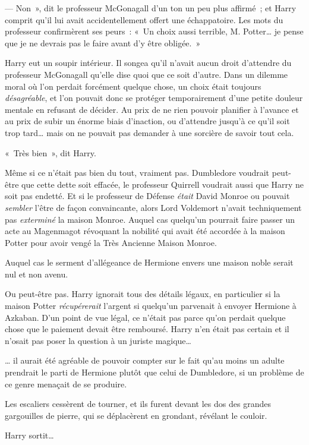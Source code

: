--- Non~», dit le professeur McGonagall d'un ton un peu plus affirmé~; et Harry comprit qu'il lui avait accidentellement offert une échappatoire.
Les mots du professeur confirmèrent ses peurs~: «~Un choix aussi terrible, M. Potter… je pense que je ne devrais pas le faire avant d'y être obligée.~»

Harry eut un soupir intérieur.
Il songea qu'il n'avait aucun droit d'attendre du professeur McGonagall qu'elle dise quoi que ce soit d'autre.
Dans un dilemme moral où l'on perdait forcément quelque chose, un choix était toujours \emph{désagréable}, et l'on pouvait donc se protéger temporairement d'une petite douleur mentale en refusant de décider.
Au prix de ne rien pouvoir planifier à l'avance et au prix de subir un énorme biais d'inaction, ou d'attendre jusqu'à ce qu'il soit trop tard… mais on ne pouvait pas demander à une sorcière de savoir tout cela.

«~Très bien~», dit Harry.

Même si ce n'était pas bien du tout, vraiment pas.
Dumbledore voudrait peut-être que cette dette soit effacée, le professeur Quirrell voudrait aussi que Harry ne soit pas endetté.
Et si le professeur de Défense \emph{était} David Monroe ou pouvait \emph{sembler} l'être de façon convaincante, alors Lord Voldemort n'avait techniquement pas \emph{exterminé} la maison Monroe.
Auquel cas quelqu'un pourrait faire passer un acte au Magenmagot révoquant la nobilité qui avait été accordée à la maison Potter pour avoir vengé la Très Ancienne Maison Monroe.

Auquel cas le serment d'allégeance de Hermione envers une maison noble serait nul et non avenu.

Ou peut-être pas.
Harry ignorait tous des détails légaux, en particulier si la maison Potter \emph{récupérerait} l'argent si quelqu'un parvenait à envoyer Hermione à Azkaban.
D'un point de vue légal, ce n'était pas parce qu'on perdait quelque chose que le paiement devait être remboursé.
Harry n'en était pas certain et il n'osait pas poser la question à un juriste magique…

… il aurait été agréable de pouvoir compter sur le fait qu'au moins un adulte prendrait le parti de Hermione plutôt que celui de Dumbledore, si un problème de ce genre menaçait de se produire.

Les escaliers cessèrent de tourner, et ils furent devant les dos des grandes gargouilles de pierre, qui se déplacèrent en grondant, révélant le couloir.

Harry sortit…


